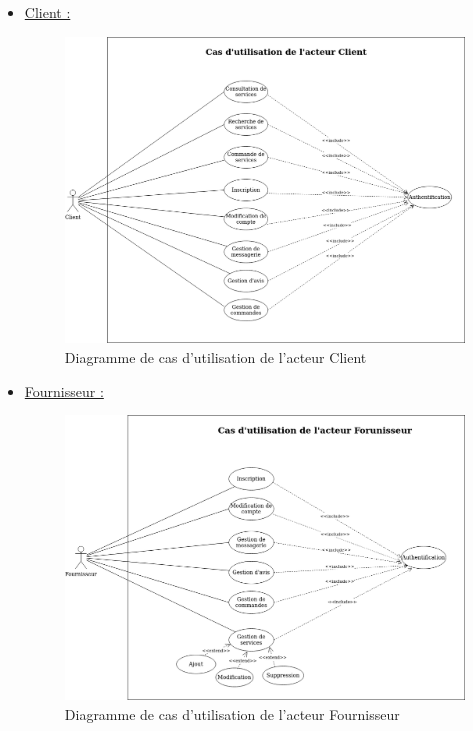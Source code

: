 \documentclass[french]{report}
\begin{document}
\begin{itemize}
\newpage
    \item \underline{Client :} 
        \begin{figure}[H]
            \centering
            \includegraphics[width=1\textwidth]{images/Use Case Client.drawio.png}
            \caption{Diagramme de cas d'utilisation de l'acteur Client}
            \label{fig:my_label}
        \end{figure}
        
\newpage
    \item \underline{Fournisseur :}
        \begin{figure}[H]
            \centering
            \includegraphics[width=1\textwidth]{images/Use case Fournisseur.drawio.png}
            \caption{Diagramme de cas d'utilisation de l'acteur Fournisseur}
            \label{fig:my_label}
        \end{figure}
        

\end{itemize}
\end{document}
